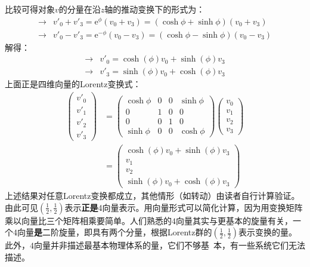 比较可得对象$v$的分量在沿$z$轴的推动变换下的形式为：
\begin{align*}
    \rightarrow& v'_0 + v'_3 = \mathrm{e}^{\phi} (v_0 + v_3) = ( \cosh \phi + \sinh \phi) (v_0 + v_3) \\
    \rightarrow& v'_0 - v'_3 = \mathrm{e}^{- \phi} (v_0 - v_3) = ( \cosh \phi - \sinh \phi) (v_0 - v_3)
\end{align*}
解得：
\begin{align}
    \rightarrow& v'_0 = \cosh(\phi) v_0 + \sinh(\phi) v_3 \nonumber \\
\label{equ3.220}
    \rightarrow& v'_3 = \sinh(\phi) v_0 + \cosh (\phi) v_3
\end{align}
上面正是四维向量的Lorentz变换式：
\begin{align}
    \begin{pmatrix}
        v'_0 \\ v'_1 \\ v'_2 \\ v'_3
    \end{pmatrix}
    &=
    \begin{pmatrix}
        \cosh \phi & 0 & 0 & \sinh \phi \\
        0 & 1 & 0 & 0 \\
        0 & 0 & 1 & 0 \\
        \sinh \phi & 0 & 0 & \cosh \phi
    \end{pmatrix}
    \begin{pmatrix}
        v_0 \\ v_1 \\ v_2 \\ v_3
    \end{pmatrix}
    \nonumber \\
\label{equ3.221}
    &=
        \begin{pmatrix}
            \cosh(\phi) v_0 + \sinh (\phi) v_3 \\
            v_1 \\
            v_2 \\
            \sinh(\phi) v_0 + \cosh(\phi) v_3
        \end{pmatrix}
\end{align}
上述结果对任意Lorentz变换都成立，其他情形（如转动）由读者自行计算验证。由此可见$(\frac{1}{2}, \frac{1}{2})$表示{\bf 正是}4向量表示。用向量形式可以简化计算，因为用变换矩阵乘以向量比三个矩阵相乘要简单。人们熟悉的$4$向量其实与更基本的旋量有关，一个$4$向量{\bf 是}二阶旋量，即具有两个分量，根据Lorentz群的$(\frac{1}{2}, \frac{1}{2})$表示变换的量。此外，$4$向量并非描述最基本物理体系的量，它们不够基\ 本，有一些系统它们无法描述。

